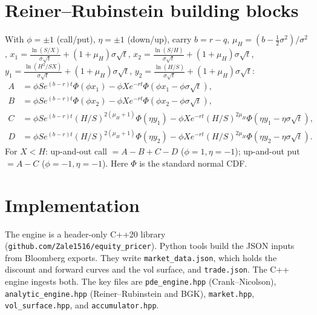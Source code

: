 \documentclass[11pt]{article}
\begin{document}
\section{Reiner--Rubinstein building blocks}\label{app:rr}
With $\phi=\pm1$ (call/put), $\eta=\pm1$ (down/up), carry $b=r-q$, $\mu_H=(b-\tfrac12\sigma^2)/\sigma^2$,
$x_1=\tfrac{\ln(S/X)}{\sigma\sqrt t}+(1+\mu_H)\sigma\sqrt t$,
$x_2=\tfrac{\ln(S/H)}{\sigma\sqrt t}+(1+\mu_H)\sigma\sqrt t$,
$y_1=\tfrac{\ln(H^2/SX)}{\sigma\sqrt t}+(1+\mu_H)\sigma\sqrt t$,
$y_2=\tfrac{\ln(H/S)}{\sigma\sqrt t}+(1+\mu_H)\sigma\sqrt t$:
\begin{align}
A &= \phi S e^{(b-r)t}\Phi(\phi x_1) - \phi X e^{-rt}\Phi(\phi x_1-\phi\sigma\sqrt t),\\
B &= \phi S e^{(b-r)t}\Phi(\phi x_2) - \phi X e^{-rt}\Phi(\phi x_2-\phi\sigma\sqrt t),\\
C &= \phi S e^{(b-r)t}(H/S)^{2(\mu_H+1)}\Phi(\eta y_1) - \phi X e^{-rt}(H/S)^{2\mu_H}\Phi(\eta y_1-\eta\sigma\sqrt t),\\
D &= \phi S e^{(b-r)t}(H/S)^{2(\mu_H+1)}\Phi(\eta y_2) - \phi X e^{-rt}(H/S)^{2\mu_H}\Phi(\eta y_2-\eta\sigma\sqrt t).
\end{align}
For $X<H$: up-and-out call $=A-B+C-D$ ($\phi{=}1,\eta{=}{-}1$); up-and-out put $=A-C$
($\phi{=}{-}1,\eta{=}{-}1$). Here $\Phi$ is the standard normal CDF.

\section{Implementation}\label{app:impl}
The engine is a header-only C++20 library (\texttt{github.com/Zale1516/equity\_pricer}). Python
tools build the JSON inputs from Bloomberg exports. They write \texttt{market\_data.json}, which
holds the discount and forward curves and the vol surface, and \texttt{trade.json}. The C++ engine
ingests both. The key files are \texttt{pde\_engine.hpp} (Crank--Nicolson),
\texttt{analytic\_engine.hpp} (Reiner--Rubinstein and BGK), \texttt{market.hpp},
\texttt{vol\_surface.hpp}, and \texttt{accumulator.hpp}.

\end{document}
